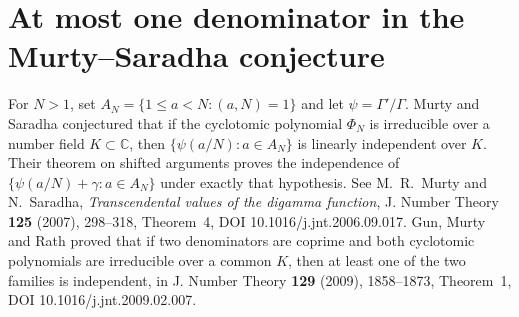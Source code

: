 \documentclass[11pt,a4paper,oneside,openany]{report}
\theoremstyle{remark}\newtheorem{remark}[theorem]{Remark}
\numberwithin{equation}{section}
\begin{document}
\section{At most one denominator in the Murty--Saradha conjecture}
For $N>1$, set $A_N=\{1\le a<N:(a,N)=1\}$ and let
$\psi=\Gamma'/\Gamma$. Murty and Saradha conjectured that if the
cyclotomic polynomial $\Phi_N$ is irreducible over a number field
$K\subset\mathbb C$, then $\{\psi(a/N):a\in A_N\}$ is linearly
independent over $K$. Their theorem on shifted arguments proves the independence of
$\{\psi(a/N)+\gamma:a\in A_N\}$ under exactly that hypothesis.
See M.~R.~Murty and N.~Saradha, \emph{Transcendental values of the
digamma function}, J. Number Theory \textbf{125} (2007), 298--318,
Theorem~4, DOI 10.1016/j.jnt.2006.09.017. Gun, Murty and Rath proved
that if two denominators are coprime and both cyclotomic polynomials
are irreducible over a common $K$, then at least one of the two
families is independent, in J. Number Theory \textbf{129} (2009),
1858--1873, Theorem~1, DOI 10.1016/j.jnt.2009.02.007.
\end{document}
